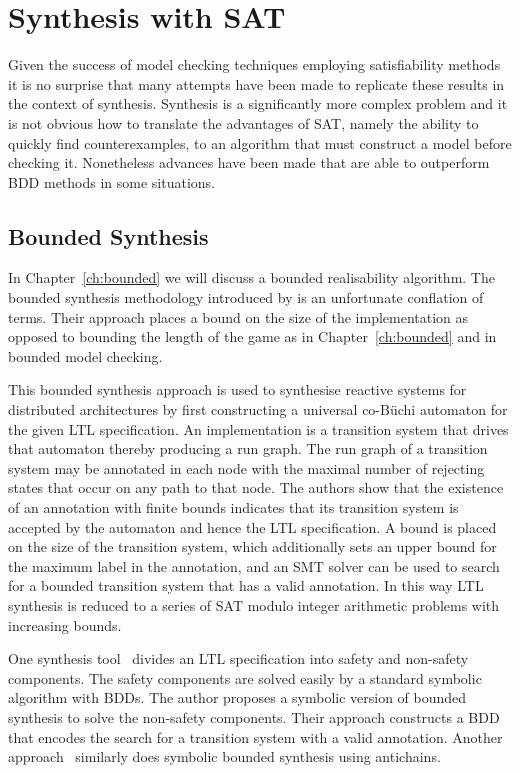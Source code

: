 \section{Synthesis with SAT}

Given the success of model checking techniques employing satisfiability methods it is no surprise that many attempts have been made to replicate these results in the context of synthesis. Synthesis is a significantly more complex problem and it is not obvious how to translate the advantages of SAT, namely the ability to quickly find counterexamples, to an algorithm that must construct a model before checking it. Nonetheless advances have been made that are able to outperform BDD methods in some situations.

\subsection{Bounded Synthesis}

In Chapter~\ref{ch:bounded} we will discuss a bounded realisability algorithm. The bounded synthesis methodology introduced by \cite{Finkbeiner13} is an unfortunate conflation of terms. Their approach places a bound on the size of the implementation as opposed to bounding the length of the game as in Chapter~\ref{ch:bounded} and in bounded model checking. 

This bounded synthesis approach is used to synthesise reactive systems for distributed architectures by first constructing a universal co-B\"uchi automaton for the given LTL specification. An implementation is a transition system that drives that automaton thereby producing a run graph. The run graph of a transition system may be annotated in each node with the maximal number of rejecting states that occur on any path to that node. The authors show that the existence of an annotation with finite bounds indicates that its transition system is accepted by the automaton and hence the LTL specification. A bound is placed on the size of the transition system, which additionally sets an upper bound for the maximum label in the annotation, and an SMT solver can be used to search for a bounded transition system that has a valid annotation. In this way LTL synthesis is reduced to a series of SAT modulo integer arithmetic problems with increasing bounds.

One synthesis tool~\cite{Ehlers12} divides an LTL specification into safety and non-safety components. The safety components are solved easily by a standard symbolic algorithm with BDDs. The author proposes a symbolic version of bounded synthesis to solve the non-safety components. Their approach constructs a BDD that encodes the search for a transition system with a valid annotation. Another approach~\cite{Filiot11} similarly does symbolic bounded synthesis using antichains.

